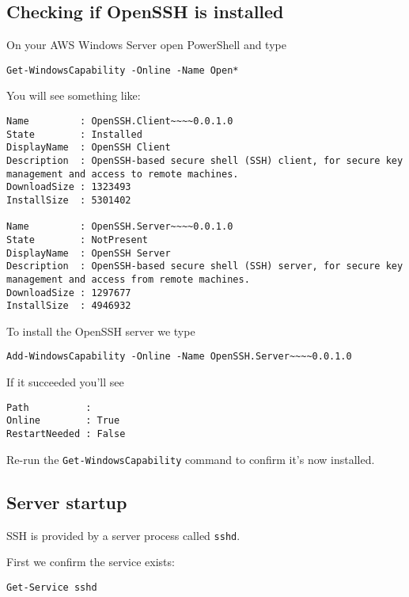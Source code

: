 \documentclass{pgnotes}
\begin{document}
\subsection{Checking if OpenSSH is
installed}\label{checking-if-openssh-is-installed}

On your AWS Windows Server open PowerShell and type

\begin{verbatim}
Get-WindowsCapability -Online -Name Open*
\end{verbatim}

You will see something like:

\begin{verbatim}
Name         : OpenSSH.Client~~~~0.0.1.0
State        : Installed
DisplayName  : OpenSSH Client
Description  : OpenSSH-based secure shell (SSH) client, for secure key management and access to remote machines.
DownloadSize : 1323493
InstallSize  : 5301402

Name         : OpenSSH.Server~~~~0.0.1.0
State        : NotPresent
DisplayName  : OpenSSH Server
Description  : OpenSSH-based secure shell (SSH) server, for secure key management and access from remote machines.
DownloadSize : 1297677
InstallSize  : 4946932
\end{verbatim}

To install the OpenSSH server we type

\begin{verbatim}
Add-WindowsCapability -Online -Name OpenSSH.Server~~~~0.0.1.0
\end{verbatim}

If it succeeded you'll see

\begin{verbatim}
Path          :
Online        : True
RestartNeeded : False
\end{verbatim}

Re-run the \texttt{Get-WindowsCapability} command to confirm it's now
installed.

\subsection{Server startup}\label{server-startup}

SSH is provided by a server process called \texttt{sshd}.

First we confirm the service exists:

\begin{verbatim}
Get-Service sshd
\end{verbatim}
\end{document}
